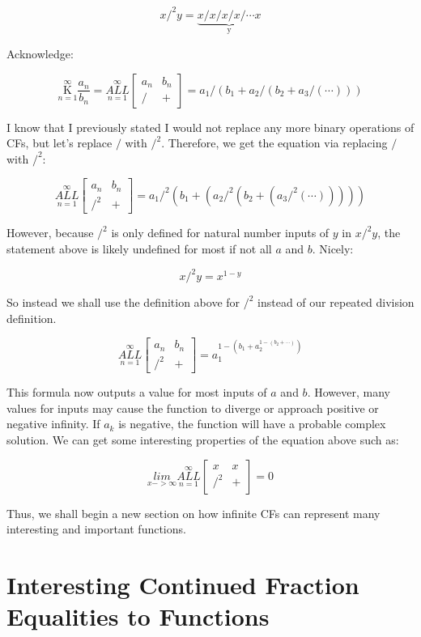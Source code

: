 \documentclass{article}
\begin{document}
$$x/^2y = \underbrace{x/x/x/x/ \cdots x}_\text{y}$$

Acknowledge:

$$\underset{n=1}{\overset{\infty}{ \mathrm K}} \frac{a_n}{b_n} = \underset{n=1}{\overset{\infty}{ALL}} \begin{bmatrix}
a_n & b_n \\
/ & +
\end{bmatrix} = a_1 / (b_1 + a_2 / ( b_2 + a_3 / ( \cdots )))$$

I know that I previously stated I would not replace any more binary operations of CFs, but let’s replace $/$ with $/^2$. Therefore, we get the equation via replacing $/$ with $/^2$:

$$\underset{n=1}{\overset{\infty}{ALL}} \begin{bmatrix}
a_n & b_n \\
/^2 & +
\end{bmatrix} = a_1 /^2 (b_1 + (a_2 /^2 (b_2 + (a_3 /^2 ( \cdots )))))$$

However, because $/^2$ is only defined for natural number inputs of $y$ in $x/^2y$, the statement above is likely undefined for most if not all $a$ and $b$. Nicely:
 
$$x /^2 y = x^{1-y}$$

So instead we shall use the definition above for $/^2$ instead of our repeated division definition.

$$\underset{n=1}{\overset{\infty}{ALL}} \begin{bmatrix}
a_n & b_n \\
/^2 & +
\end{bmatrix} = a_1^{1-(b_1+a_2^{1-(b_2+\cdots)})}$$

This formula now outputs a value for most inputs of $a$ and $b$. However, many values for inputs may cause the function to diverge or approach positive or negative infinity. If $a_k$ is negative, the function will have a probable complex solution. We can get some interesting properties of the equation above such as:

$$\underset{x->\infty}{lim} \underset{n=1}{\overset{\infty}{ALL}} \begin{bmatrix}
x & x \\
/^2 & +
\end{bmatrix} = 0$$

Thus, we shall begin a new section on how infinite CFs can represent many interesting and important functions.

\section{Interesting Continued Fraction Equalities to Functions}
\end{document}
